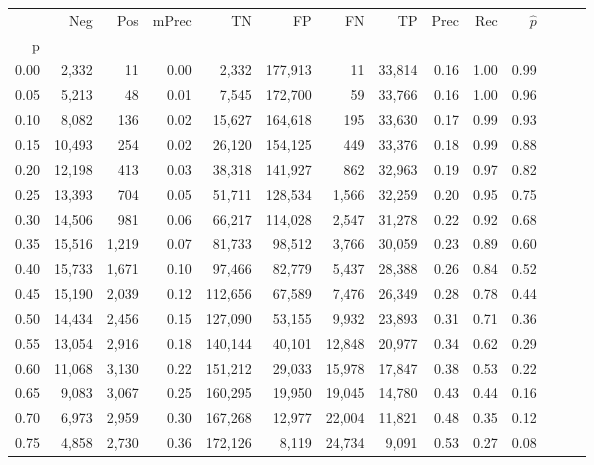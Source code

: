\begin{tabular}{rrrrrrrrrrrrrr}
\toprule
{} &     Neg &    Pos & mPrec &       TN &       FP &      FN &      TP &  Prec &   Rec & $\hat{p}$ \\
p    &         &        &       &          &          &         &         &       &       &           \\
\midrule
0.00 &   2,332 &     11 &  0.00 &    2,332 &  177,913 &      11 &  33,814 &  0.16 &  1.00 &      0.99 \\
0.05 &   5,213 &     48 &  0.01 &    7,545 &  172,700 &      59 &  33,766 &  0.16 &  1.00 &      0.96 \\
0.10 &   8,082 &    136 &  0.02 &   15,627 &  164,618 &     195 &  33,630 &  0.17 &  0.99 &      0.93 \\
0.15 &  10,493 &    254 &  0.02 &   26,120 &  154,125 &     449 &  33,376 &  0.18 &  0.99 &      0.88 \\
0.20 &  12,198 &    413 &  0.03 &   38,318 &  141,927 &     862 &  32,963 &  0.19 &  0.97 &      0.82 \\
0.25 &  13,393 &    704 &  0.05 &   51,711 &  128,534 &   1,566 &  32,259 &  0.20 &  0.95 &      0.75 \\
0.30 &  14,506 &    981 &  0.06 &   66,217 &  114,028 &   2,547 &  31,278 &  0.22 &  0.92 &      0.68 \\
0.35 &  15,516 &  1,219 &  0.07 &   81,733 &   98,512 &   3,766 &  30,059 &  0.23 &  0.89 &      0.60 \\
0.40 &  15,733 &  1,671 &  0.10 &   97,466 &   82,779 &   5,437 &  28,388 &  0.26 &  0.84 &      0.52 \\
0.45 &  15,190 &  2,039 &  0.12 &  112,656 &   67,589 &   7,476 &  26,349 &  0.28 &  0.78 &      0.44 \\
0.50 &  14,434 &  2,456 &  0.15 &  127,090 &   53,155 &   9,932 &  23,893 &  0.31 &  0.71 &      0.36 \\
0.55 &  13,054 &  2,916 &  0.18 &  140,144 &   40,101 &  12,848 &  20,977 &  0.34 &  0.62 &      0.29 \\
0.60 &  11,068 &  3,130 &  0.22 &  151,212 &   29,033 &  15,978 &  17,847 &  0.38 &  0.53 &      0.22 \\
0.65 &   9,083 &  3,067 &  0.25 &  160,295 &   19,950 &  19,045 &  14,780 &  0.43 &  0.44 &      0.16 \\
0.70 &   6,973 &  2,959 &  0.30 &  167,268 &   12,977 &  22,004 &  11,821 &  0.48 &  0.35 &      0.12 \\
0.75 &   4,858 &  2,730 &  0.36 &  172,126 &    8,119 &  24,734 &   9,091 &  0.53 &  0.27 &      0.08 \\

\end{tabular}
